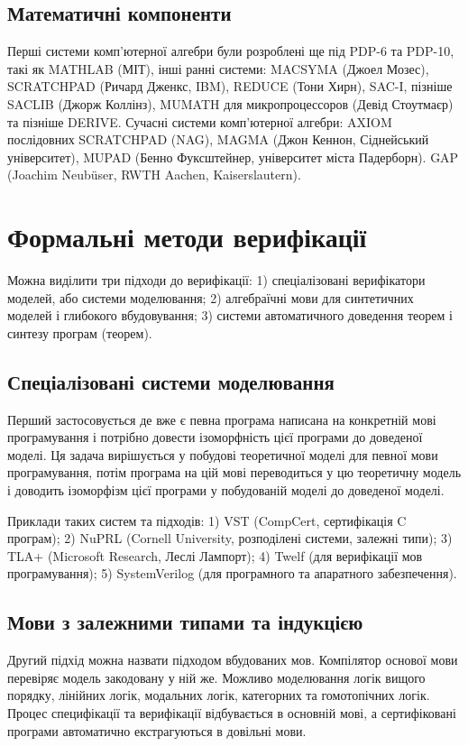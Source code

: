 \subsection{Математичні компоненти}
Перші системи комп'ютерної алгебри були розроблені ще під PDP-6 та PDP-10,
такі як MATHLAB (МІТ), інші ранні системи:
MACSYMA (Джоел Мозес),
SCRATCHPAD (Ричард Дженкс, IBM),
REDUCE (Тони Хирн),
SAC-I, пізніше SACLIB (Джорж Коллінз),
MUMATH для микропроцессоров (Девід Стоутмаєр) та пізніше DERIVE.
Сучасні системи комп'ютерної алгебри:
AXIOM послідовних SCRATCHPAD (NAG),
MAGMA (Джон Кеннон, Сіднейський університет),
MUPAD (Бенно Фуксштейнер, університет міста Падерборн).
GAP (Joachim Neubüser, RWTH Aachen, Kaiserslautern).

\section{Формальні методи верифікації}
Можна виділити три підходи до верифікації:
1) спеціалізовані верифікатори моделей, або системи моделювання;
2) алгебраїчні мови для синтетичних моделей і глибокого вбудовування;
3) системи автоматичного доведення теорем і синтезу програм (теорем).

\subsection{Спеціалізовані системи моделювання}
Перший застосовується де вже є певна програма написана на конкретній мові
програмування і потрібно довести ізоморфність цієї програми до доведеної моделі.
Ця задача вирішується у побудові теоретичної моделі для певної мови програмування,
потім програма на цій мові переводиться у цю теоретичну модель і доводить
ізоморфізм цієї програми у побудованій моделі до доведеної моделі.

Приклади таких систем та підходів:
1) VST (CompCert, сертифікація C програм);
2) NuPRL (Cornell University, розподілені системи, залежні типи);
3) TLA+ (Microsoft Research, Леслі Лампорт);
4) Twelf (для верифікації мов програмування);
5) SystemVerilog (для програмного та апаратного забезпечення).

\subsection{Мови з залежними типами та індукцією}
Другий підхід можна назвати підходом вбудованих мов.
Компілятор основої мови перевіряє модель закодовану у ній же. Можливо моделювання
логік вищого порядку, лінійних логік, модальних логік, категорних та гомотопічних логік.
Процес специфікації та верифікації відбувається в основній мові, а сертифіковані програми
автоматично екстрагуються в довільні мови.


